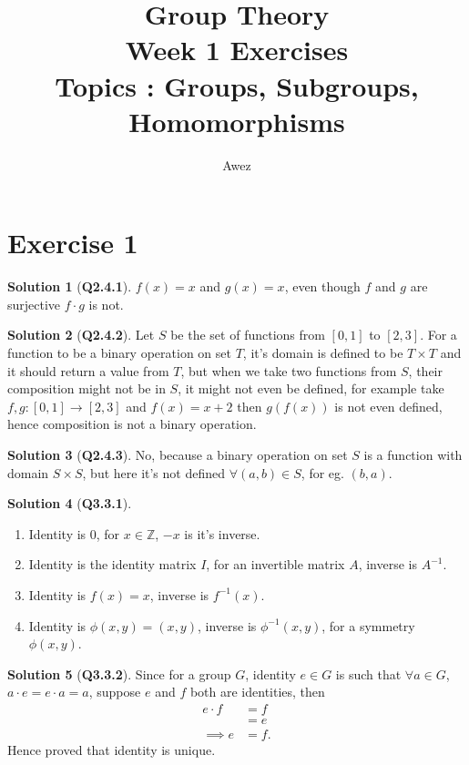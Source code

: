 \documentclass{article}
\title{\textbf{Group Theory} \\
Week 1 Exercises \\
{\large Topics : Groups, Subgroups, Homomorphisms}}
\author{Awez}
\date{}
\theoremstyle{definition}
\newtheorem*{sol}{Solution}
\begin{document}
\maketitle

\section{Exercise 1}
\begin{sol}[\textbf{Q2.4.1}]
	$f(x)=x$ and $g(x)=x$, even though $f$ and $g$ are surjective $f\cdot g$ is not.
\end{sol}

\begin{sol}[\textbf{Q2.4.2}]
	Let $S$ be the set of functions from $[0, 1]$ to $[ 2,3 ]$. For a function to be a binary operation on set $T$, it's domain is defined to be $T \times T$ and it should return a value from $T$, but when we take two functions from $S$, their composition might not be in $S$, it might not even be defined, for example take $f,g: [0,1] \rightarrow [2,3]$ and $f(x) = x+2$ then $g(f(x))$ is not even defined, hence composition is not a binary operation.
\end{sol}

\begin{sol}[\textbf{Q2.4.3}]
	No, because a binary operation on set $S$ is a function with domain $S\times S$, but here  it's not defined $\forall (a,b) \in S$, for eg. $(b,a)$.
\end{sol}

\begin{sol}[\textbf{Q3.3.1}]
	\begin{enumerate}
		\item Identity is $0$, for $x \in \mathbb{Z}$, $-x$ is it's inverse.
		\item Identity is the identity matrix $I$, for an invertible matrix $A$, inverse is $A^{-1}$.
		\item Identity is $f(x)=x$, inverse is $f^{-1}(x)$.
		\item Identity is $\phi(x,y)=(x,y)$, inverse is $\phi^{-1}(x,y)$, for a symmetry $\phi(x,y)$.
	\end{enumerate}
\end{sol}

\begin{sol}[\textbf{Q3.3.2}]
	Since for a group $G$, identity $e\in G$ is such that $\forall a \in G$, $a\cdot e = e\cdot a = a$, suppose $e$ and $f$ both are identities, then
	\begin{align}
		e\cdot f   & = f \\
		           & = e \\
		\implies e & =f.
	\end{align}
	Hence proved that identity is unique.
\end{sol}
\end{document}
